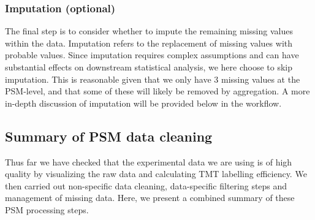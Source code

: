\documentclass[9pt,a4paper,]{extarticle}
\begin{document}
\hypertarget{imputation-optional}{%
\subsubsection{Imputation (optional)}\label{imputation-optional}}

The final step is to consider whether to impute the remaining missing values
within the data. Imputation refers to the replacement of missing values with
probable values. Since imputation requires complex assumptions and can have
substantial effects on downstream statistical analysis, we here choose to skip
imputation. This is reasonable given that we only have 3 missing values at the
PSM-level, and that some of these will likely be removed by aggregation. A more
in-depth discussion of imputation will be provided below in the workflow.

\hypertarget{summary-of-psm-data-cleaning}{%
\subsection{Summary of PSM data cleaning}\label{summary-of-psm-data-cleaning}}

Thus far we have checked that the experimental data we are using is of high
quality by visualizing the raw data and calculating TMT labelling efficiency. We
then carried out non-specific data cleaning, data-specific filtering steps and
management of missing data. Here, we present a combined summary of these PSM
processing steps.
\end{document}
